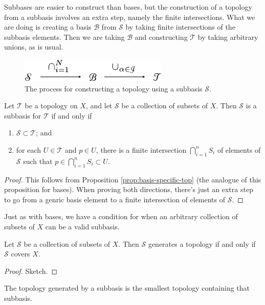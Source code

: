 \documentclass[10pt]{report}
\begin{document}
Subbases are easier to construct than bases, but the construction of a topology from a subbasis involves an extra step, namely the finite intersections. What we are doing is creating a basis $\mathcal{B}$ from $\mathcal{S}$ by taking finite intersections of the subbasis elements. Then we are taking $\mathcal{B}$ and constructing $\mathcal{T}$ by taking arbitrary unions, as is usual.

\begin{figure}[H]
	\centering
	\includegraphics[scale=1]{fig/subbasis-to-topology.pdf}
	\caption{The process for constructing a topology using a subbasis $\mathcal{S}$.}
\end{figure}

\begin{prop}
Let $\mathcal{T}$ be a topology on $X$, and let $\mathcal{S}$ be a collection of subsets of $X$. Then $\mathcal{S}$ is a subbasis for $\mathcal{T}$ if and only if
\begin{enumerate}
	\item $\mathcal{S} \subset \mathcal{T}$; and
	\item for each $U \in \mathcal{T}$ and $p \in U$, there is a finite intersection $\bigcap_{i=1}^n S_i$ of elements of $\mathcal{S}$ such that $p \in \bigcap_{i=1}^n S_i \subset U$.
\end{enumerate}
\end{prop}
\begin{proof}
	This follows from Proposition \ref{prop:basis-specific-top} (the analogue of this proposition for bases). When proving both directions, there's just an extra step to go from a genric basis element to a finite intersection of elements of $\mathcal{S}$.
\end{proof}

Just as with bases, we have a condition for when an arbitrary collection of subsets of $X$ can be a valid subbasis.

\begin{prop}
Let $\mathcal{S}$ be a collection of subsets of $X$. Then $\mathcal{S}$ generates a topology if and only if $\mathcal{S}$ covers $X$.
\end{prop}
\begin{proof}
{\color{red}Sketch.}
\end{proof}

\begin{prop}
The topology generated by a subbasis is the smallest topology containing that subbasis.
\end{prop}
\end{document}
